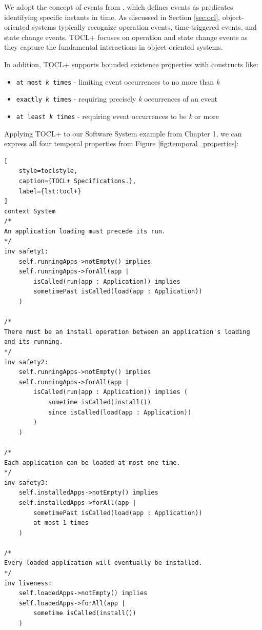 We adopt the concept of events from \cite{TemporalAndEventOCL}, which defines events 
as predicates identifying specific instants in time. As discussed in Section 
\ref{sec:ocl}, object-oriented systems typically recognize operation events, 
time-triggered events, and state change events. TOCL+ focuses on operation and 
state change events as they capture the fundamental interactions in object-oriented 
systems.

In addition, TOCL+ supports bounded existence properties with constructs like:
\begin{itemize}
    \item \texttt{at most \textit{k} times} - limiting event occurrences to no more 
    than \textit{k}
    \item \texttt{exactly \textit{k} times} - requiring precisely \textit{k} 
    occurrences of an event
    \item \texttt{at least \textit{k} times} - requiring event occurrences to be 
    \textit{k} or more
\end{itemize}

Applying TOCL+ to our Software System example from Chapter 1, we can express all 
four temporal properties from Figure \ref{fig:temporal_properties}:

\begin{lstlisting}[
    style=toclstyle, 
    caption={TOCL+ Specifications.}, 
    label={lst:tocl+}
]
context System
/*
An application loading must precede its run.
*/
inv safety1: 
    self.runningApps->notEmpty() implies
    self.runningApps->forAll(app |
        isCalled(run(app : Application)) implies
        sometimePast isCalled(load(app : Application))
    )

/*
There must be an install operation between an application's loading and its running.
*/
inv safety2: 
    self.runningApps->notEmpty() implies
    self.runningApps->forAll(app |
        isCalled(run(app : Application)) implies (
            sometime isCalled(install())
            since isCalled(load(app : Application))
        )
    )

/*
Each application can be loaded at most one time.
*/
inv safety3:
    self.installedApps->notEmpty() implies
    self.installedApps->forAll(app |
        sometimePast isCalled(load(app : Application))
        at most 1 times
    )

/*
Every loaded application will eventually be installed.
*/
inv liveness:
    self.loadedApps->notEmpty() implies
    self.loadedApps->forAll(app | 
        sometime isCalled(install())
    )
\end{lstlisting}

